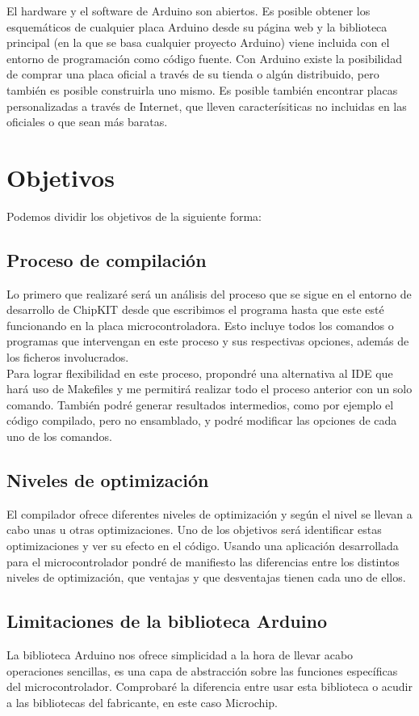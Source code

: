 El hardware y el software de Arduino son abiertos. Es posible obtener los esquemáticos de cualquier placa Arduino desde su página web y la biblioteca principal (en la que se basa cualquier proyecto Arduino) viene incluida con el entorno de programación como código fuente. Con Arduino existe la posibilidad de comprar una placa oficial a través de su tienda o algún distribuido, pero también es posible construirla uno mismo. Es posible también encontrar placas personalizadas a través de Internet, que lleven caracterísiticas no incluidas en las oficiales o que sean más baratas.
\section{Objetivos}
Podemos dividir los objetivos de la siguiente forma:

\subsection{Proceso de compilación}
Lo primero que realizaré será un análisis del proceso que se sigue en el entorno de desarrollo de ChipKIT desde que escribimos el programa hasta que este esté funcionando en la placa microcontroladora.  Esto incluye todos los comandos o programas que intervengan en este proceso y sus respectivas opciones, además de los ficheros involucrados.\\
Para lograr flexibilidad en este proceso, propondré una alternativa al IDE que hará uso de Makefiles y me permitirá realizar todo el proceso anterior con un solo comando. También podré generar resultados intermedios, como por ejemplo el código compilado, pero no ensamblado, y podré modificar las opciones de cada uno de los comandos.

\subsection{Niveles de optimización}
El compilador ofrece diferentes niveles de optimización y según el nivel se llevan a cabo unas u otras optimizaciones. Uno de los objetivos será identificar estas optimizaciones y ver su efecto en el código. Usando una aplicación desarrollada para el microcontrolador pondré de manifiesto las diferencias entre los distintos niveles de optimización, que ventajas y que desventajas tienen cada uno de ellos.

\subsection{Limitaciones de la biblioteca Arduino}
La biblioteca Arduino nos ofrece simplicidad a la hora de llevar acabo operaciones sencillas, es una capa de abstracción sobre las funciones específicas del microcontrolador. Comprobaré la diferencia entre usar esta biblioteca o acudir a las bibliotecas del fabricante, en este caso Microchip.

